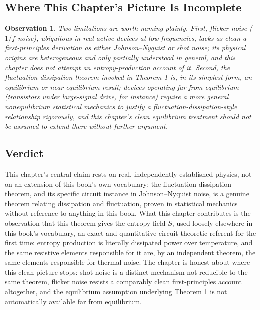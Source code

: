 \documentclass[12pt]{article}
\newtheorem{observation}{Observation}
\begin{document}
\subsection{Where This Chapter's Picture Is Incomplete}

\begin{observation}
Two limitations are worth naming plainly. First, flicker noise ($1/f$ noise), ubiquitous in real active devices at low frequencies, lacks as clean a first-principles derivation as either Johnson--Nyquist or shot noise; its physical origins are heterogeneous and only partially understood in general, and this chapter does not attempt an entropy-production account of it. Second, the fluctuation-dissipation theorem invoked in Theorem 1 is, in its simplest form, an equilibrium or near-equilibrium result; devices operating far from equilibrium (transistors under large-signal drive, for instance) require a more general nonequilibrium statistical mechanics to justify a fluctuation-dissipation-style relationship rigorously, and this chapter's clean equilibrium treatment should not be assumed to extend there without further argument.
\end{observation}

\subsection{Verdict}

This chapter's central claim rests on real, independently established physics, not on an extension of this book's own vocabulary: the fluctuation-dissipation theorem, and its specific circuit instance in Johnson--Nyquist noise, is a genuine theorem relating dissipation and fluctuation, proven in statistical mechanics without reference to anything in this book. What this chapter contributes is the observation that this theorem gives the entropy field $S$, used loosely elsewhere in this book's vocabulary, an exact and quantitative circuit-theoretic referent for the first time: entropy production is literally dissipated power over temperature, and the same resistive elements responsible for it are, by an independent theorem, the same elements responsible for thermal noise. The chapter is honest about where this clean picture stops: shot noise is a distinct mechanism not reducible to the same theorem, flicker noise resists a comparably clean first-principles account altogether, and the equilibrium assumption underlying Theorem 1 is not automatically available far from equilibrium.
\end{document}
